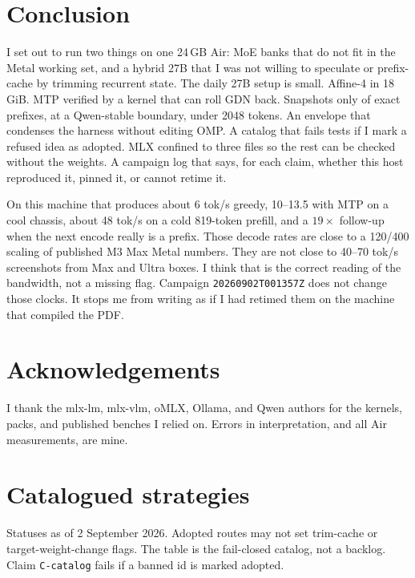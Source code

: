 \section{Conclusion}
\label{sec:conc}

I set out to run two things on one 24\,GB Air: MoE banks that do not fit in the Metal working set, and a hybrid 27B that I was not willing to speculate or prefix-cache by trimming recurrent state. The daily 27B setup is small. Affine-4 in 18\,GiB. MTP verified by a kernel that can roll GDN back. Snapshots only of exact prefixes, at a Qwen-stable boundary, under 2048 tokens. An envelope that condenses the harness without editing OMP. A catalog that fails tests if I mark a refused idea as adopted. MLX confined to three files so the rest can be checked without the weights. A campaign log that says, for each claim, whether this host reproduced it, pinned it, or cannot retime it.

On this machine that produces about 6 tok/s greedy, 10--13.5 with MTP on a cool chassis, about 48 tok/s on a cold 819-token prefill, and a $19\times$ follow-up when the next encode really is a prefix. Those decode rates are close to a 120/400 scaling of published M3 Max Metal numbers. They are not close to 40--70 tok/s screenshots from Max and Ultra boxes. I think that is the correct reading of the bandwidth, not a missing flag. Campaign \texttt{20260902T001357Z} does not change those clocks. It stops me from writing as if I had retimed them on the machine that compiled the PDF.

\section*{Acknowledgements}

I thank the mlx-lm, mlx-vlm, oMLX, Ollama, and Qwen authors for the kernels, packs, and published benches I relied on. Errors in interpretation, and all Air measurements, are mine.




\appendix
\section{Catalogued strategies}
\label{app:catalog}

Statuses as of 2 September 2026. Adopted routes may not set trim-cache or target-weight-change flags. The table is the fail-closed catalog, not a backlog. Claim \texttt{C-catalog} fails if a banned id is marked adopted.

